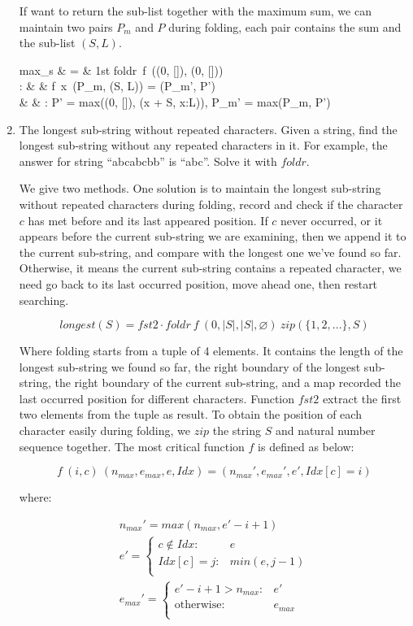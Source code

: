 \documentclass[UTF8]{article}
\begin{document}
\begin{enumerate}
If want to return the sub-list together with the maximum sum, we can maintain two pairs $P_m$ and $P$ during folding, each pair contains the sum and the sub-list $(S, L)$.

\blre
max_s & = & 1st \cdot foldr\ f\ ((0, []), (0, [])) \\
: & & f\ x\ (P_m, (S, L)) = (P_m', P') \\
& & :  P' = max((0, []), (x + S, x:L)), P_m' = max(P_m, P') \\
\elre

\item The longest sub-string without repeated characters. Given a string, find the longest sub-string without any repeated characters in it. For example, the answer for string ``abcabcbb'' is ``abc''. Solve it with $foldr$.

We give two methods. One solution is to maintain the longest sub-string without repeated characters during folding, record and check if the character $c$ has met before and its last appeared position. If $c$ never occurred, or it appears before the current sub-string we are examining, then we append it to the current sub-string, and compare with the longest one we've found so far. Otherwise, it means the current sub-string contains a repeated character, we need go back to its last occurred position, move ahead one, then restart searching.

\[
longest(S) = fst2 \cdot foldr\ f\ (0, |S|, |S|, \varnothing)\ zip(\{1, 2, ...\}, S)
\]

Where folding starts from a tuple of 4 elements. It contains the length of the longest sub-string we found so far, the right boundary of the longest sub-string, the right boundary of the current sub-string, and a map recorded the last occurred position for different characters. Function $fst2$ extract the first two elements from the tuple as result. To obtain the position of each character easily during folding, we $zip$ the string $S$ and natural number sequence together. The most critical function $f$ is defined as below:

\[
f\ (i, c)\ (n_{max}, e_{max}, e, Idx) = (n_{max}', e_{max}', e', Idx[c] = i)
\]

where:

\[ \begin{array}{l}
n_{max}' = max(n_{max}, e' - i + 1) \\
e' = \begin{cases}
  c \notin Idx: & e \\
  Idx[c] = j: & min(e, j - 1) \\
  \end{cases} \\
e_{max}' = \begin{cases}
  e' - i + 1 > n_{max}: & e' \\
  \text{otherwise}: & e_{max} \\
  \end{cases} \\
\end{array} \]


\end{enumerate}
\end{document}
